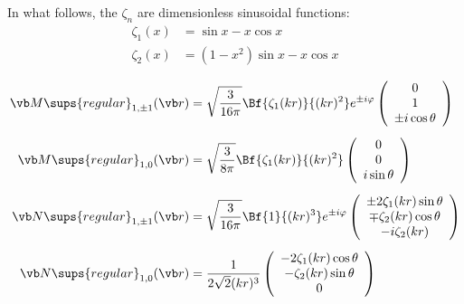 \documentclass[letterpaper]{article}
\begin{document}
In what follows, the $\zeta_n$ are dimensionless sinusoidal functions:
\begin{align*}
 \zeta_1(x) &= \sin x - x \cos x \\
 \zeta_2(x) &= (1-x^2)\sin x - x \cos x
\end{align*}

\begin{align*}
 \vb M\sups{regular}_{1,\pm 1}(\vb r)
  &=\sqrt\frac{3}{16\pi}\Bf{\zeta_1(kr)}{(kr)^2} e^{\pm i\varphi}
    \left(\begin{array}{c}
    0                 \\
    1                 \\
    \pm i\cos \theta
    \end{array}\right)
\\[5pt]
 \vb M\sups{regular}_{1,0}(\vb r)
  &=\sqrt\frac{3}{8\pi}\Bf{\zeta_1(kr)}{(kr)^2}
    \left(\begin{array}{c}
    0                 \\
    0                 \\
    i\sin \theta
    \end{array}\right)
\\[5pt]
 \vb N\sups{regular}_{1,\pm 1}(\vb r)
  &=\sqrt\frac{3}{16\pi}\Bf{1}{(kr)^3} e^{\pm i\varphi}
    \left(\begin{array}{c}
    \pm 2\zeta_1(kr) \sin \theta \\
    \mp\zeta_2(kr) \cos \theta \\
    -i\zeta_2(kr)
    \end{array}\right)
\\[5pt]
 \vb N\sups{regular}_{1,0}(\vb r)
  &=\frac{1}{2\sqrt{2}(kr)^3}
    \left(\begin{array}{c}
    -2\zeta_1(kr)\cos\theta \\
    -\zeta_2(kr)\sin\theta  \\
    0                
    \end{array}\right)
\end{align*}
\end{document}
